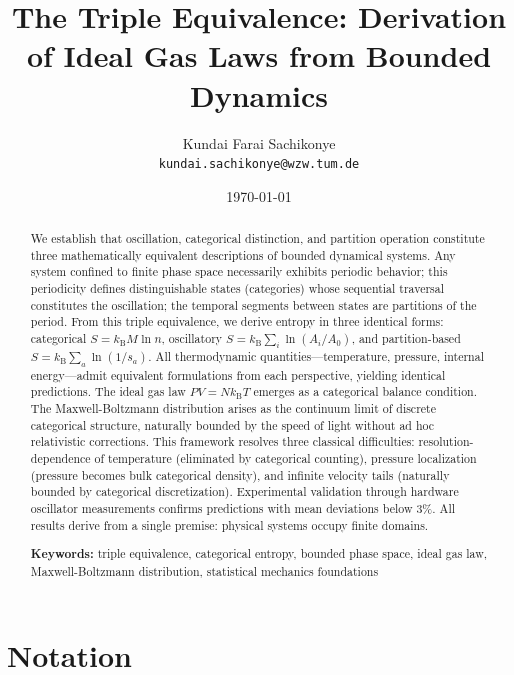 \documentclass[twocolumn,10pt]{article}
\title{\textbf{The Triple Equivalence: Derivation of Ideal Gas Laws from Bounded Dynamics}}
\author{Kundai Farai Sachikonye\\
\texttt{kundai.sachikonye@wzw.tum.de}}
\date{\today}
\theoremstyle{definition}
\theoremstyle{remark}
\newcommand{\kB}{k_{\mathrm{B}}}
\begin{document}
\maketitle

\begin{abstract}
We establish that oscillation, categorical distinction, and partition operation constitute three mathematically equivalent descriptions of bounded dynamical systems. Any system confined to finite phase space necessarily exhibits periodic behavior; this periodicity defines distinguishable states (categories) whose sequential traversal constitutes the oscillation; the temporal segments between states are partitions of the period. From this triple equivalence, we derive entropy in three identical forms: categorical $S = \kB M \ln n$, oscillatory $S = \kB \sum_i \ln(A_i/A_0)$, and partition-based $S = \kB \sum_a \ln(1/s_a)$. All thermodynamic quantities---temperature, pressure, internal energy---admit equivalent formulations from each perspective, yielding identical predictions. The ideal gas law $PV = N\kB T$ emerges as a categorical balance condition. The Maxwell-Boltzmann distribution arises as the continuum limit of discrete categorical structure, naturally bounded by the speed of light without ad hoc relativistic corrections. This framework resolves three classical difficulties: resolution-dependence of temperature (eliminated by categorical counting), pressure localization (pressure becomes bulk categorical density), and infinite velocity tails (naturally bounded by categorical discretization). Experimental validation through hardware oscillator measurements confirms predictions with mean deviations below 3\%. All results derive from a single premise: physical systems occupy finite domains.

\textbf{Keywords:} triple equivalence, categorical entropy, bounded phase space, ideal gas law, Maxwell-Boltzmann distribution, statistical mechanics foundations
\end{abstract}

\section*{Notation}
\end{document}
